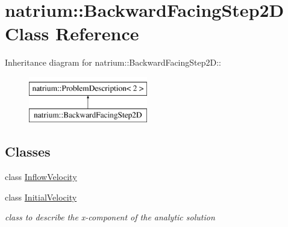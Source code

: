\hypertarget{classnatrium_1_1BackwardFacingStep2D}{
\section{natrium::BackwardFacingStep2D Class Reference}
\label{classnatrium_1_1BackwardFacingStep2D}
}
Inheritance diagram for natrium::BackwardFacingStep2D::\begin{figure}[H]
\begin{center}
\leavevmode
\includegraphics[height=2cm]{classnatrium_1_1BackwardFacingStep2D}
\end{center}
\end{figure}
\subsection*{Classes}
\begin{DoxyCompactItemize}
\item 
class \hyperlink{classnatrium_1_1BackwardFacingStep2D_1_1InflowVelocity}{InflowVelocity}
\item 
class \hyperlink{classnatrium_1_1BackwardFacingStep2D_1_1InitialVelocity}{InitialVelocity}
\begin{DoxyCompactList}\small\item\em class to describe the x-\/component of the analytic solution \item\end{DoxyCompactList}\end{DoxyCompactItemize}
